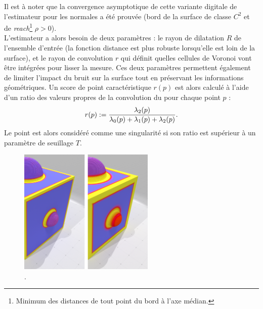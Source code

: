 %
Il est à noter que la convergence asymptotique de cette variante digitale de
l'estimateur \VCM pour les normales a été prouvée (bord de la surface de classe
$C^2$ et de \emph{reach}\footnote{Minimum des distances de tout point du bord à
l'axe médian.} $\rho > 0$)\cite{Cuel2014DGCI}.
%
\\
%
L'estimateur \VCM a alors besoin de deux paramètres : le rayon de dilatation $R$
de l'ensemble d'entrée (la fonction distance est plus robuste lorsqu'elle est
loin de la surface), et le rayon de convolution $r$ qui définit quelles cellules
de Voronoi vont être intégrées pour lisser la mesure. Ces deux paramètres
permettent également de limiter l'impact du bruit sur la surface tout en
préservant les informations géométriques. Un score de point caractéristique
$r(p)$ est alors calculé à l'aide d'un ratio des valeurs propres de la
convolution du \VCM pour chaque point $p$ :
%
\begin{equation}
  r(p) := \frac{\lambda_2(p)}{\lambda_0(p) + \lambda_1(p) + \lambda_2(p)}.
\end{equation}
%
Le point est alors considéré comme une singularité si son ratio est supérieur à
un paramètre de seuillage $T$.
%
\begin{figure}[ht]{
  \begin{center}
    \includegraphics[height=6cm]{figures/CubeSpherePlotVCM}
  \end{center}}
    \caption[.]{.
    \label{fig:VCM-cubesphere}}
\end{figure}
%
%

